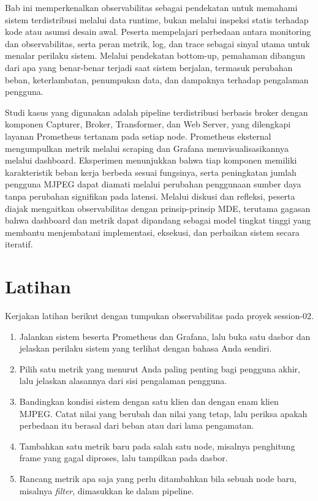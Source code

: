 Bab ini memperkenalkan observabilitas sebagai pendekatan untuk memahami sistem terdistribusi melalui data runtime, bukan melalui inspeksi statis terhadap kode atau asumsi desain awal. Peserta mempelajari perbedaan antara monitoring dan observabilitas, serta peran metrik, log, dan trace sebagai sinyal utama untuk menalar perilaku sistem. Melalui pendekatan bottom-up, pemahaman dibangun dari apa yang benar-benar terjadi saat sistem berjalan, termasuk perubahan beban, keterlambatan, penumpukan data, dan dampaknya terhadap pengalaman pengguna.

Studi kasus yang digunakan adalah pipeline terdistribusi berbasis broker dengan komponen Capturer, Broker, Transformer, dan Web Server, yang dilengkapi layanan Prometheus tertanam pada setiap node. Prometheus eksternal mengumpulkan metrik melalui scraping dan Grafana memvisualisasikannya melalui dashboard. Eksperimen menunjukkan bahwa tiap komponen memiliki karakteristik beban kerja berbeda sesuai fungsinya, serta peningkatan jumlah pengguna MJPEG dapat diamati melalui perubahan penggunaan sumber daya tanpa perubahan signifikan pada latensi. Melalui diskusi dan refleksi, peserta diajak mengaitkan observabilitas dengan prinsip-prinsip MDE, terutama gagasan bahwa dashboard dan metrik dapat dipandang sebagai model tingkat tinggi yang membantu menjembatani implementasi, eksekusi, dan perbaikan sistem secara iteratif.

\section{Latihan}

Kerjakan latihan berikut dengan tumpukan observabilitas pada proyek session-02.

\begin{enumerate}
  \item Jalankan sistem beserta Prometheus dan Grafana, lalu buka satu dasbor dan jelaskan perilaku sistem yang terlihat dengan bahasa Anda sendiri.
  \item Pilih satu metrik yang menurut Anda paling penting bagi pengguna akhir, lalu jelaskan alasannya dari sisi pengalaman pengguna.
  \item Bandingkan kondisi sistem dengan satu klien dan dengan enam klien MJPEG. Catat nilai yang berubah dan nilai yang tetap, lalu periksa apakah perbedaan itu berasal dari beban atau dari lama pengamatan.
  \item Tambahkan satu metrik baru pada salah satu node, misalnya penghitung frame yang gagal diproses, lalu tampilkan pada dasbor.
  \item Rancang metrik apa saja yang perlu ditambahkan bila sebuah node baru, misalnya \textit{filter}, dimasukkan ke dalam pipeline.
\end{enumerate}

